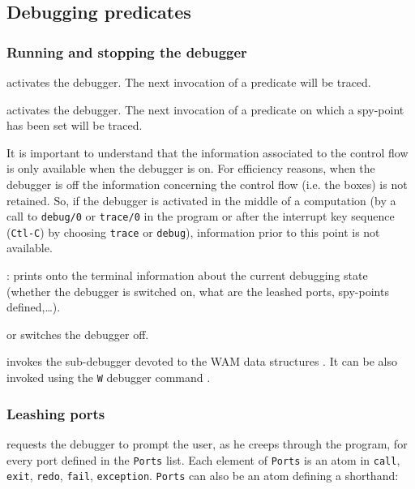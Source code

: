 \subsection{Debugging predicates}

\subsubsection{Running and stopping the debugger}
\label{Running-and-stopping-the-debugger}
 activates the debugger. The next invocation of a predicate
will be traced.

 activates the debugger. The next invocation of a predicate
on which a spy-point has been set will be traced.

It is important to understand that the information associated to the control
flow is only available when the debugger is on. For efficiency reasons, when
the debugger is off the information concerning the control flow (i.e. the
boxes) is not retained. So, if the debugger is activated in the middle of a
computation (by a call to \texttt{debug/0} or \texttt{trace/0} in the
program or after the interrupt key sequence (\texttt{Ctl-C}) by choosing
\texttt{trace} or \texttt{debug}), information prior to this point is not
available.

: prints onto the terminal information about the current
debugging state (whether the debugger is switched on, what are the leashed
ports, spy-points defined,\ldots).

 or  switches the debugger off.

 invokes the sub-debugger devoted to the WAM data
structures . It can be also invoked using the
\texttt{W} debugger command .

\subsubsection{Leashing ports}
\label{Leashing-ports}
 requests the debugger to prompt the user, as
he creeps through the program, for every port defined in the \texttt{Ports}
list. Each element of \texttt{Ports} is an atom in \texttt{call},
\texttt{exit}, \texttt{redo}, \texttt{fail}, \texttt{exception}.
\texttt{Ports} can also be an atom defining a shorthand:

